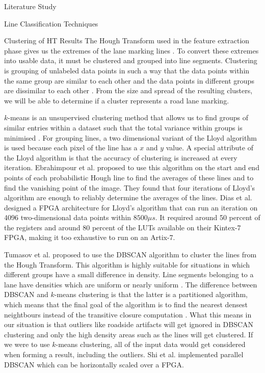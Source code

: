\documentclass{matthijs}
\begin{document}
\begin{hoofdstuk}{Literature Study}
\begin{paragraaf}{Line Classification Techniques}
\begin{subparagraaf}{Clustering of HT Results}
				The Hough Transform used in the feature extraction phase gives us the extremes of the lane marking lines \cite{gupta2016automated}.
				To convert these extremes into usable data, it must be clustered and grouped into line segments.
				Clustering is grouping of unlabeled data points in such a way that the data points within the same group are similar to each other and the data points in different groups are dissimilar to each other \cite{sharma2020kmeans}.
				From the size and spread of the resulting clusters, we will be able to determine if a cluster represents a road lane marking.
				\bigskip

				$k$-means is an unsupervised clustering method that allows us to find groups of similar entries within a dataset such that the total variance within groups is minimised \cite{martin2019implementing}.
				For grouping lines, a two dimensional variant of the Lloyd algorithm is used because each pixel of the line has a $x$ and $y$ value.
				A special attribute of the Lloyd algorithm is that the accuracy of clustering is increased at every iteration.
				Ebrahimpour et al. \cite{ebrahimpour2012vanishing} proposed to use this algorithm on the start and end points of each probabilistic Hough line to find the averages of these lines and to find the vanishing point of the image.
				They found that four iterations of Lloyd's algorithm are enough to reliably determine the averages of the lines.
				Dias et al. \cite{dias2020parallel} designed a FPGA architecture for Lloyd's algorithm that can run an iteration on 4096 two-dimensional data points within $8500 \mu s$.
				It required around 50 percent of the registers and around 80 percent of the LUTs available on their Kintex-7 FPGA, making it too exhaustive to run on an Artix-7.

				\bigskip

				Tumasov et al. \cite{tumasov2021research} proposed to use the DBSCAN algorithm to cluster the lines from the Hough Transform.
				This algorithm is highly suitable for situations in which different groups have a small difference in density.
				Line segments belonging to a lane have densities which are uniform or nearly uniform \cite{niu2016robust}.
				The difference between DBSCAN and $k$-means clustering is that the latter is a partitioned algorithm, which means that the final goal of the algorithm is to find the nearest densest neightbours instead of the transitive closure computation \cite{shi2014fpga}.
				What this means in our situation is that outliers like roadside artifacts will get ignored in DBSCAN clustering and only the high density areas such as the lines will get clustered.
				If we were to use $k$-means clustering, all of the input data would get considered when forming a result, including the outliers.
				Shi et al. \cite{shi2014fpga} implemented parallel DBSCAN which can be horizontally scaled over a FPGA.


\end{subparagraaf}
\end{paragraaf}
\end{hoofdstuk}
\end{document}
